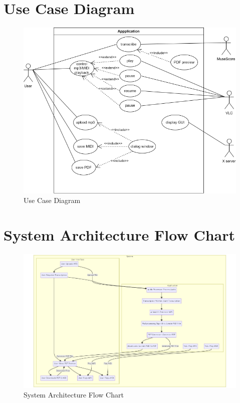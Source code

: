 \documentclass{article}
\begin{document}
\FloatBarrier
\clearpage
\section{Use Case Diagram}
\begin{figure}[htbp]
    \centering
    \includegraphics[width=\textwidth]{../diagrams/use_case.png}
    \caption{Use Case Diagram}
    \label{fig:use_case}
\end{figure}

\FloatBarrier
\clearpage
\section{System Architecture Flow Chart}
\begin{figure}[htbp]
    \centering
    \includegraphics[width=\textwidth]{../diagrams/system_architecture.png}
    \caption{System Architecture Flow Chart}
    \label{fig:system_architecture}
\end{figure}
\end{document}

